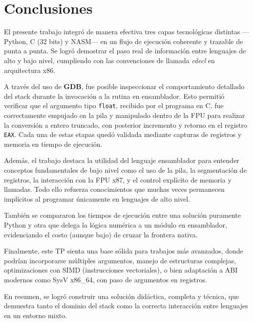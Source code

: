 \documentclass[a4paper,12pt]{article}
\begin{document}
\section{Conclusiones}

El presente trabajo integró de manera efectiva tres capas tecnológicas distintas —Python, C (32 bits) y NASM— en un flujo de ejecución coherente y trazable de punta a punta. Se logró demostrar el paso real de información entre lenguajes de alto y bajo nivel, cumpliendo con las convenciones de llamada \emph{cdecl} en arquitectura x86.

A través del uso de \textbf{GDB}, fue posible inspeccionar el comportamiento detallado del stack durante la invocación a la rutina en ensamblador. Esto permitió verificar que el argumento tipo \texttt{float}, recibido por el programa en C, fue correctamente empujado en la pila y manipulado dentro de la FPU para realizar la conversión a entero truncado, con posterior incremento y retorno en el registro \texttt{EAX}. Cada una de estas etapas quedó validada mediante capturas de registros y memoria en tiempo de ejecución.

Además, el trabajo destaca la utilidad del lenguaje ensamblador para entender conceptos fundamentales de bajo nivel como el uso de la pila, la segmentación de registros, la interacción con la FPU x87, y el control explícito de memoria y llamadas. Todo ello refuerza conocimientos que muchas veces permanecen implícitos al programar únicamente en lenguajes de alto nivel.

También se compararon los tiempos de ejecución entre una solución puramente Python y otra que delega la lógica numérica a un módulo en ensamblador, evidenciando el costo (aunque bajo) de cruzar la frontera nativa.

Finalmente, este TP sienta una base sólida para trabajos más avanzados, donde podrían incorporarse múltiples argumentos, manejo de estructuras complejas, optimizaciones con SIMD (instrucciones vectoriales), o bien adaptación a ABI modernos como SysV x86\_64, con paso de argumentos en registros.

En resumen, se logró construir una solución didáctica, completa y técnica, que demuestra tanto el dominio del stack como la correcta interacción entre lenguajes en un entorno mixto.
\end{document}
